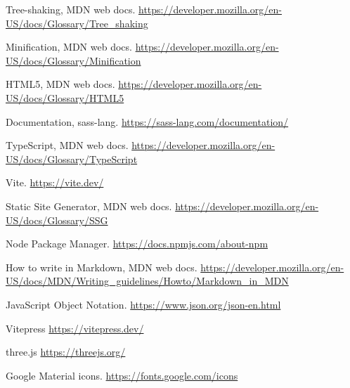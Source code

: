 \documentclass[letterpaper,11pt]{article}
\begin{document}
{\begin{thebibliography}{99}
 Tree-shaking, MDN web docs. \url{https://developer.mozilla.org/en-US/docs/Glossary/Tree_shaking}

 Minification, MDN web docs. \url{https://developer.mozilla.org/en-US/docs/Glossary/Minification}

 HTML5,  MDN web docs. \url{https://developer.mozilla.org/en-US/docs/Glossary/HTML5}

 Documentation, sass-lang. \url{https://sass-lang.com/documentation/}

 TypeScript,  MDN web docs. \url{https://developer.mozilla.org/en-US/docs/Glossary/TypeScript}

 Vite. \url{https://vite.dev/}

 Static Site Generator, MDN web docs. \url{https://developer.mozilla.org/en-US/docs/Glossary/SSG}

 Node Package Manager. \url{https://docs.npmjs.com/about-npm}

 How to write in Markdown, MDN web docs. \url{https://developer.mozilla.org/en-US/docs/MDN/Writing_guidelines/Howto/Markdown_in_MDN}

 JavaScript Object Notation. \url{https://www.json.org/json-en.html}

 Vitepress \url{https://vitepress.dev/}

 three.js \url{https://threejs.org/}

 Google Material icons. \url{https://fonts.google.com/icons}



\end{thebibliography}
} %
   
\end{document}
